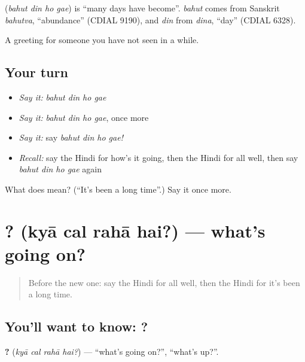 \begin{cousinweb}
\textbf{   } (\emph{bahut din ho gae}) is \textquotedblleft{}many days have become\textquotedblright{}. \emph{bahut} comes from Sanskrit \emph{bahutva}, \textquotedblleft{}abundance\textquotedblright{} (CDIAL 9190), and \emph{din} from \emph{dina}, \textquotedblleft{}day\textquotedblright{} (CDIAL 6328).
\end{cousinweb}

\begin{grammarlens}[title={What you've built}]
A greeting for someone you have not seen in a while.
\end{grammarlens}

\subsection*{Your turn}
\begin{itemize}
\raggedright
  \item \emph{Say it:} \emph{bahut din ho gae}
  \item \emph{Say it:} \emph{bahut din ho gae}, once more
  \item \emph{Say it:} say \emph{bahut din ho gae!}
  \item \emph{Recall:} say the Hindi for how's it going, then the Hindi for all well, then say \emph{bahut din ho gae} again
\end{itemize}

\begin{tcolorbox}[breakable,colback=teal!4,colframe=teal!35!black,title={Before you move on}]
What does     mean? (\textquotedblleft{}It's been a long time\textquotedblright{}.) Say it once more.
\end{tcolorbox}
\section[\texorpdfstring{\hi{क्या} \hi{चल} \hi{रहा} \hi{है}? (kyā cal rahā hai?)}{क्या चल रहा है? (kyā cal rahā hai?)}]{   ? (kyā cal rahā hai?) — what's going on?}

\label{lesson:HI-C123-kyachal}



\begin{quote}
Before the new one: say the Hindi for all well, then the Hindi for it's been a long time.
\end{quote}

\subsection*{You'll want to know:    ?}
\textbf{   ?} (\emph{kyā cal rahā hai?}) — \textquotedblleft{}what's going on?\textquotedblright{}, \textquotedblleft{}what's up?\textquotedblright{}.

